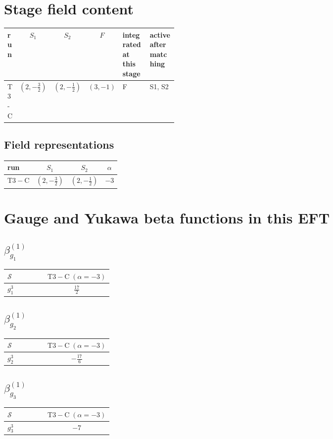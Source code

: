 \documentclass[9pt]{article}
\begin{document}
\section*{Stage field content}
\begin{longtable}{@{}lccc p{0.20\linewidth}p{0.20\linewidth}@{}}
\toprule
run & $S_1$ & $S_2$ & $F$ & integrated at this stage & active after matching \\
\midrule
T3-C & $(2,- \frac{3}{2})$ & $(2,- \frac{1}{2})$ & $(3,-1)$ & F & S1, S2 \\
\bottomrule
\end{longtable}
\subsection*{Field representations}
\begin{longtable}{@{}lccc@{}}
\toprule
run & $S_1$ & $S_2$ & $\alpha$ \\
\midrule
$\mathrm{T3-C}$ & $(2,- \frac{3}{2})$ & $(2,- \frac{1}{2})$ & $-3$ \\
\bottomrule
\end{longtable}
\section*{Gauge and Yukawa beta functions in this EFT}
\subsection*{$ \beta_{g_1}^{(1)} $}
\begin{longtable}{@{}p{0.38\linewidth}c@{}}
\toprule
$\mathcal{S}$ & $ \mathrm{T3-C}\;(\alpha=-3) $ \\
\midrule
$ g_1^3 $ & $ \frac{17}{2} $ \\
\bottomrule
\end{longtable}
\subsection*{$ \beta_{g_2}^{(1)} $}
\begin{longtable}{@{}p{0.38\linewidth}c@{}}
\toprule
$\mathcal{S}$ & $ \mathrm{T3-C}\;(\alpha=-3) $ \\
\midrule
$ g_2^3 $ & $ - \frac{17}{6} $ \\
\bottomrule
\end{longtable}
\subsection*{$ \beta_{g_3}^{(1)} $}
\begin{longtable}{@{}p{0.38\linewidth}c@{}}
\toprule
$\mathcal{S}$ & $ \mathrm{T3-C}\;(\alpha=-3) $ \\
\midrule
$ g_3^3 $ & $ -7 $ \\
\bottomrule
\end{longtable}
\end{document}

